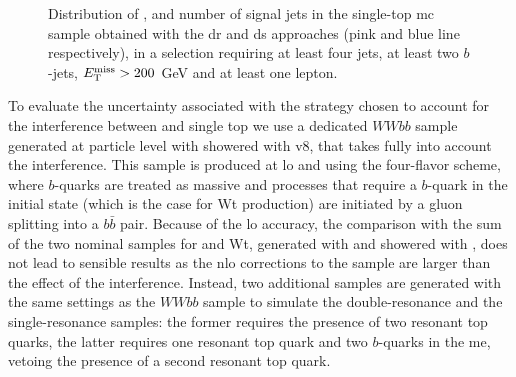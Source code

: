 \begin{figure}[h!]
\centering 
{}
\caption{Distribution of  \met,   \mtb and  number of signal jets in the single-top \gls{mc} sample obtained with the \gls{dr} and \gls{ds} approaches (pink and blue line respectively), in a selection requiring at least four jets, at least two $b$-jets, $E_{\rm T}^{\mathrm{miss}}>200$ GeV and at least one lepton. 
}\label{fig:st_1L}
\end{figure}

To evaluate the uncertainty associated with the strategy chosen to account for the interference between \ttbar and single top
we use a dedicated $WWbb$ sample generated at particle level with \aNLO showered with \PY v8, that takes fully into account the interference.
This sample is produced at \gls{lo} and using the four-flavor scheme, where $b$-quarks are treated as massive and processes that require a $b$-quark in the initial state (which is the case for Wt production) are initiated by a gluon splitting into a $b\bar{b}$ pair. 
Because of the \gls{lo} accuracy, the comparison with the sum of the two nominal samples for \ttbar and Wt, generated with \PowhegBox and showered with \PY, does not lead to sensible 
results as the \gls{nlo} corrections to the \ttbar sample are larger than the effect of the interference. 
Instead, two additional samples are generated with the same settings as the $WWbb$ sample to simulate the double-resonance and the single-resonance samples: the former requires the presence of two resonant top quarks, the latter requires one resonant top quark and two $b$-quarks in the \gls{me}, vetoing the presence of a second resonant top quark.  


